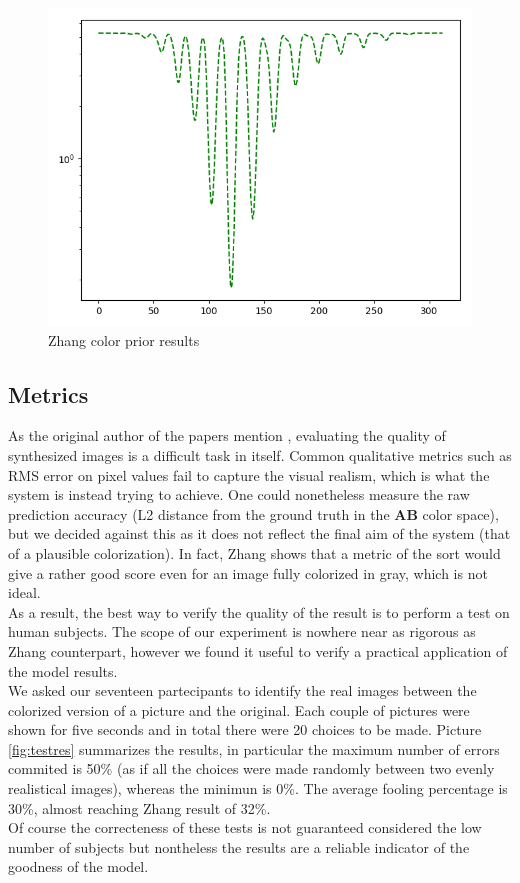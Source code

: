 \documentclass[twoside,twocolumn]{article}
\begin{document}
\begin{figure}[h]
	\includegraphics[width=\linewidth]{img/zhang.png}
	\caption{Zhang \cite{Zhang:2016} color prior results}
	\label{fig:zhangprior}
\end{figure}

\subsection{Metrics}

As the original author of the papers mention \cite{Zhang:2016}, evaluating the quality of synthesized images is a difficult task in itself. Common qualitative metrics such as RMS error on pixel values fail to capture the visual realism, which is what the system is instead trying to achieve. 
One could nonetheless measure the raw prediction accuracy (L2 distance from the ground truth in the \textbf{AB} color space), but we decided against this as it does not reflect the final aim of the system (that of a plausible colorization). In fact, Zhang \cite{Zhang:2016} shows that a metric of the sort would give a rather good score even for an image fully colorized in gray, which is not ideal.\\
As a result, the best way to verify the quality of the result is to perform a test on human subjects. The scope of our experiment is nowhere near as rigorous as Zhang counterpart, however we found it useful to verify a practical application of the model results.\\
We asked our seventeen partecipants to identify the real images between the colorized version of a picture and the original. Each couple of pictures were shown for five seconds and in total there were 20 choices to be made.
Picture \ref{fig:testres} summarizes the results, in particular the maximum number of errors commited is 50\% (as if all the choices were made randomly between two evenly realistical images), whereas the minimun is 0\%. The average fooling percentage is 30\%, almost reaching Zhang \cite{Zhang:2016} result of 32\%.\\
Of course the correcteness of these tests is not guaranteed considered the low number of subjects but nontheless the results are a reliable indicator of the goodness of the model.
\end{document}
